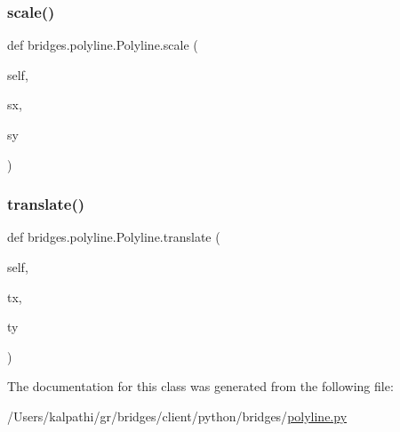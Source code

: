 \mbox{\label{classbridges_1_1polyline_1_1_polyline_a2727d3d6fa9da5ea738c51f822da16ae}} 
\subsubsection{\texorpdfstring{scale()}{scale()}}
{\footnotesize\ttfamily def bridges.\+polyline.\+Polyline.\+scale (\begin{DoxyParamCaption}\item[{}]{self,  }\item[{}]{sx,  }\item[{}]{sy }\end{DoxyParamCaption})}

\mbox{\label{classbridges_1_1polyline_1_1_polyline_a654226c0de86aa0c6b9b5181a552cbfe}} 
\subsubsection{\texorpdfstring{translate()}{translate()}}
{\footnotesize\ttfamily def bridges.\+polyline.\+Polyline.\+translate (\begin{DoxyParamCaption}\item[{}]{self,  }\item[{}]{tx,  }\item[{}]{ty }\end{DoxyParamCaption})}



The documentation for this class was generated from the following file\+:\begin{DoxyCompactItemize}
\item 
/\+Users/kalpathi/gr/bridges/client/python/bridges/\mbox{\hyperlink{polyline_8py}{polyline.\+py}}\end{DoxyCompactItemize}
